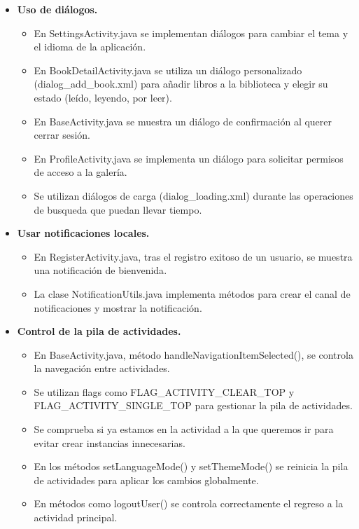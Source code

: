\documentclass[a4paper,12pt]{report}
\begin{document}
\begin{itemize}
\begin{itemize}
        \end{itemize}
        \item \textbf{Uso de diálogos.}
        \begin{itemize}
          \item En SettingsActivity.java se implementan diálogos para cambiar el tema y el idioma de la aplicación.
          \item En BookDetailActivity.java se utiliza un diálogo personalizado (dialog\_add\_book.xml) para añadir libros a la biblioteca y elegir su estado (leído, leyendo, por leer).
          \item En BaseActivity.java se muestra un diálogo de confirmación al querer cerrar sesión.
          \item En ProfileActivity.java se implementa un diálogo para solicitar permisos de acceso a la galería.
          \item Se utilizan diálogos de carga (dialog\_loading.xml) durante las operaciones de busqueda que puedan llevar tiempo.
        \end{itemize}
        \item \textbf{Usar notificaciones locales.}
        \begin{itemize}
          \item En RegisterActivity.java, tras el registro exitoso de un usuario, se muestra una notificación de bienvenida\cite{android_notifications}.
          \item La clase NotificationUtils.java implementa métodos para crear el canal de notificaciones y mostrar la notificación.
        \end{itemize}
        \item \textbf{Control de la pila de actividades.}
        \begin{itemize}
          \item En BaseActivity.java, método handleNavigationItemSelected(), se controla la navegación entre actividades.
          \item Se utilizan flags como FLAG\_ACTIVITY\_CLEAR\_TOP y FLAG\_ACTIVITY\_SINGLE\_TOP para gestionar la pila de actividades.
          \item Se comprueba si ya estamos en la actividad a la que queremos ir para evitar crear instancias innecesarias.
          \item En los métodos setLanguageMode() y setThemeMode() se reinicia la pila de actividades para aplicar los cambios globalmente.
          \item En métodos como logoutUser() se controla correctamente el regreso a la actividad principal.
          \end{itemize}
      \end{itemize}
\end{document}
